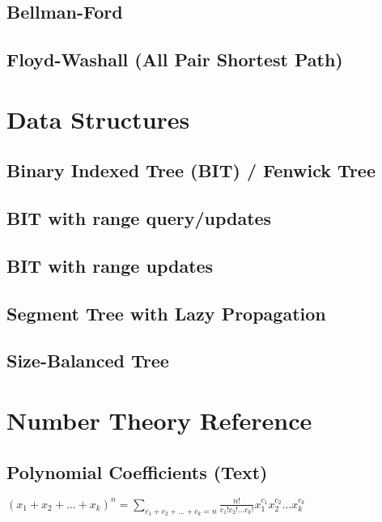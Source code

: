 \documentclass[9pt]{extarticle}
\begin{document}
\begin{multicols*}{3}
\subsection{Bellman-Ford}


\subsection{Floyd-Washall (All Pair Shortest Path)}


\section{Data Structures}

\subsection{Binary Indexed Tree (BIT) / Fenwick Tree} %


\subsection{BIT with range query/updates}


\subsection{BIT with range updates} %


\subsection{Segment Tree with Lazy Propagation} %


\subsection{Size-Balanced Tree}


\section{Number Theory Reference}
\subsection{Polynomial Coefficients (Text)} %
$(x_1 + x_2 + ... + x_k)^n = \sum_{c_1 + c_2 + ... + c_k = n}
\frac{n!}{c_1! c_2! ... c_k!} x_1^{c_1} x_2^{c_2} ... x_k^{c_k}$


\end{multicols*}
\end{document}
